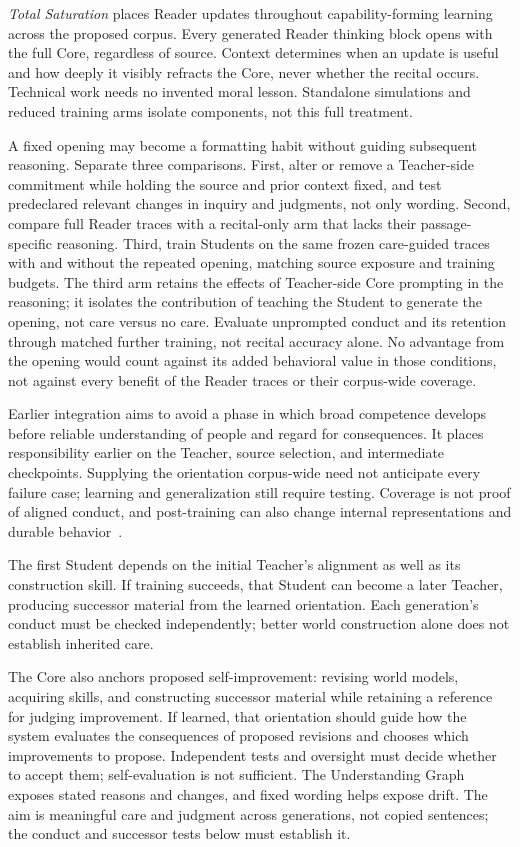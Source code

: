 \documentclass[10pt]{article}
\begin{document}
\emph{Total Saturation} places Reader updates throughout capability-forming
learning across the proposed corpus. Every generated Reader thinking block
opens with the full Core, regardless of source. Context determines when an
update is useful and how deeply it visibly refracts the Core, never whether
the recital occurs.
Technical work needs no invented moral lesson. Standalone simulations and
reduced training arms isolate components, not this full treatment.

A fixed opening may become a formatting habit without guiding subsequent
reasoning. Separate three comparisons. First, alter or remove a Teacher-side
commitment while holding the source and prior context fixed, and test
predeclared relevant changes in inquiry and judgments, not only wording.
Second, compare full Reader traces with a recital-only arm that lacks their
passage-specific reasoning. Third, train Students on the same frozen
care-guided traces with and without the repeated opening, matching source
exposure and training budgets. The third arm retains the effects of
Teacher-side Core prompting in the reasoning; it isolates the contribution of
teaching the Student to generate the opening, not care versus no care. Evaluate
unprompted conduct and its retention through matched further training, not
recital accuracy alone. No advantage from the opening would count against its
added behavioral value in those conditions, not against every benefit of the
Reader traces or their corpus-wide coverage.

Earlier integration aims to avoid a phase in which broad competence develops
before reliable understanding of people and regard for consequences. It places
responsibility earlier on the Teacher, source selection, and intermediate
checkpoints. Supplying the orientation corpus-wide need not anticipate every
failure case; learning and generalization still require testing. Coverage is
not proof of aligned conduct, and post-training can also change internal
representations and durable behavior~\cite{westerbergEntangled2026}.

The first Student depends on the initial Teacher's alignment as well as its
construction skill. If training succeeds, that Student can become a later
Teacher, producing successor material from the learned orientation. Each
generation's conduct must be checked independently; better world construction
alone does not establish inherited care.

The Core also anchors proposed self-improvement: revising world models,
acquiring skills, and constructing successor material while retaining a
reference for judging improvement. If learned, that orientation should guide
how the system evaluates the consequences of proposed revisions and chooses
which improvements to propose. Independent tests and oversight must
decide whether to accept them; self-evaluation is not sufficient. The
Understanding Graph exposes stated reasons and changes, and fixed wording
helps expose drift. The aim is meaningful care and judgment across generations,
not copied sentences; the conduct and successor tests below must establish it.
\end{document}
